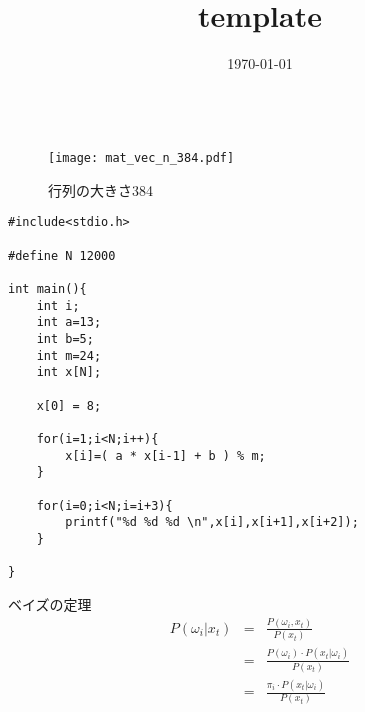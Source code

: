 \documentclass[dvipdfmx,uplatex,titlepage]{jsarticle}
\title{template}
\author{}
\date{\today}
\begin{document}
\maketitle


\begin{eqnarray}
\end{eqnarray}


\begin{figure}[H]
    \centering
    \texttt{[image: mat\_vec\_n\_384.pdf]}
    \captionsetup{labelformat=empty,labelsep=none}
    \caption{行列の大きさ384}
\end{figure}

\begin{lstlisting}[basicstyle=\ttfamily\footnotesize, frame=single]
#include<stdio.h>

#define N 12000

int main(){
    int i;
    int a=13;
    int b=5;
    int m=24;
    int x[N];

    x[0] = 8;

    for(i=1;i<N;i++){
        x[i]=( a * x[i-1] + b ) % m;
    }

    for(i=0;i<N;i=i+3){
        printf("%d %d %d \n",x[i],x[i+1],x[i+2]);
    }

}
\end{lstlisting}


\begin{itembox}[l]{ベイズの定理}
    \begin{eqnarray}
        \label{eq32}
        P( \omega _i | x_t) &=& \frac { P( \omega _i , x_t ) } {P(x_t)} \nonumber\\
         &=& \frac { P( \omega _i ) \cdot P(x_t| \omega _i)} {P(x_t)} \nonumber\\
                            &=& \frac { \pi _i  \cdot P(x_t| \omega _i)} {P(x_t)}
    \end{eqnarray}
\end{itembox}
\end{document}
